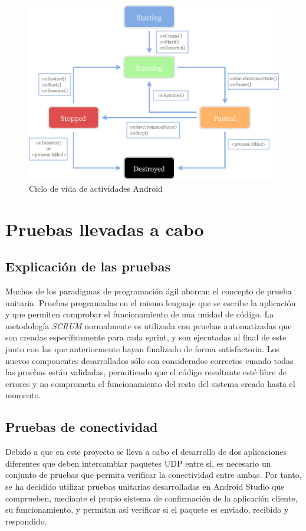 \documentclass[12pt]{article}
\begin{document}
        \begin{figure}[h!]
            \centering
                \includegraphics[scale=0.7]{android_lifecycle.eps}
                \caption*{Ciclo de vida de actividades Android}
                \label{fig:android_lifecycle}
        \end{figure}

\section{Pruebas llevadas a cabo}
    \subsection{Explicación de las pruebas}
    Muchos de los paradigmas de programación ágil abarcan el concepto de prueba unitaria. Pruebas programadas en el mismo lenguaje que se escribe la aplicación y que permiten comprobar el funcionamiento de una unidad de código. La metodología \textit{SCRUM} normalmente es utilizada con pruebas automatizadas que son creadas específicamente para cada sprint, y son ejecutadas al final de este junto con las que anteriormente hayan finalizado de forma satisfactoria. Los nuevos componentes desarrollados sólo son considerados correctos cuando todas las pruebas están validadas, permitiendo que el código resultante esté libre de errores y no comprometa el funcionamiento del resto del sistema creado hasta el momento. 

    \subsection{Pruebas de conectividad}
    Debido a que en este proyecto se lleva a cabo el desarrollo de dos aplicaciones diferentes que deben intercambiar paquetes UDP entre sí, es necesario un conjunto de pruebas que permita verificar la conectividad entre ambas. Por tanto, se ha decidido utilizar pruebas unitarias desarrolladas en Android Studio que comprueben, mediante el propio sistema de confirmación de la aplicación cliente, su funcionamiento, y permitan así verificar si el paquete es enviado, recibido y respondido.
\end{document}
